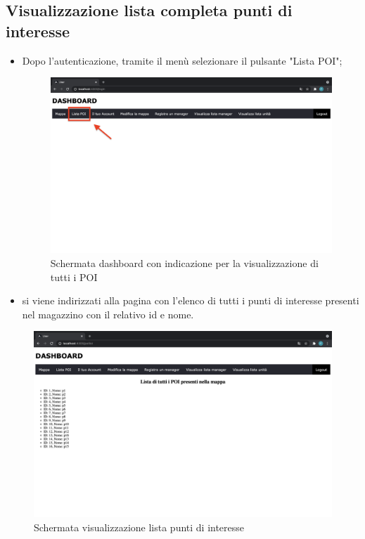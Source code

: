 \subsection{Visualizzazione lista completa punti di interesse}
\begin{itemize}
    \item Dopo l'autenticazione, tramite il menù selezionare il pulsante "Lista POI";
    \begin{figure}[H]
        \centering
        \includegraphics[scale=0.12]{res/images/dashboard2.png}
        \caption{Schermata dashboard con indicazione per la visualizzazione di tutti i POI}
    \end{figure}
    \item si viene indirizzati alla pagina con l'elenco di tutti i punti di interesse presenti nel magazzino con il relativo id e nome.

\end{itemize}

\begin{figure}[H]
    \centering
    \includegraphics[scale=0.12]{res/images/listpoi_user.png}
    \caption{Schermata visualizzazione lista punti di interesse}
\end{figure}

